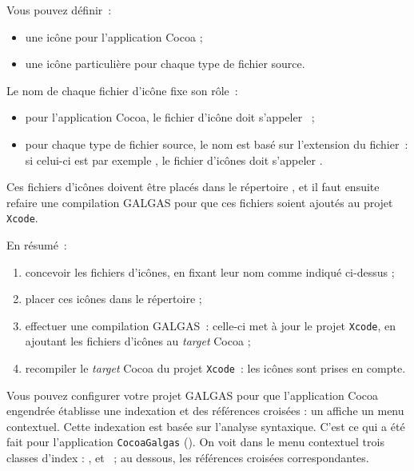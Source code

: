 
Vous pouvez définir~:
\begin{itemize}
  \item une icône pour l'application Cocoa ;
  \item une icône particulière pour chaque type de fichier source.
\end{itemize}

Le nom de chaque fichier d'icône fixe son rôle~:
\begin{itemize}
  \item pour l'application Cocoa, le fichier d'icône doit s'appeler ~;
  \item pour chaque type de fichier source, le nom est basé sur l'extension du fichier~: si celui-ci est par exemple , le fichier d'icônes doit s'appeler .
\end{itemize}

Ces fichiers d'icônes doivent être placés dans le répertoire , et il faut ensuite refaire une compilation GALGAS pour que ces fichiers soient ajoutés au projet \texttt{Xcode}.

En résumé~:
\begin{enumerate}
  \item concevoir les fichiers d'icônes, en fixant leur nom comme indiqué ci-dessus ;
  \item placer ces icônes dans le répertoire  ;
  \item effectuer une compilation GALGAS~: celle-ci met à jour le projet \texttt{Xcode}, en ajoutant les fichiers d'icônes au \emph{target} Cocoa ;
  \item recompiler le \emph{target} Cocoa du projet \texttt{Xcode}~: les icônes sont prises en compte.
\end{enumerate}














Vous pouvez configurer votre projet GALGAS pour que l'application Cocoa engendrée établisse une indexation et des références croisées : un  affiche un menu contextuel. Cette indexation est basée sur l'analyse syntaxique. C'est ce qui a été fait pour l'application \texttt{CocoaGalgas} (). On voit dans le menu contextuel trois classes d'index : ,  et ~; au dessous, les références croisées correspondantes.


